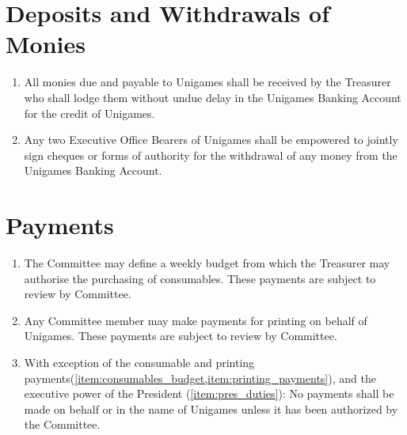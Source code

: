 \documentclass[a4paper]{article}
\begin{document}
\section{Deposits and Withdrawals of Monies} \label{sec:monies}
\begin{enumerate}
    \item All monies due and payable to Unigames shall be received by the Treasurer who shall lodge them without undue delay in the Unigames Banking Account for the credit of Unigames.
    \item Any two Executive Office Bearers of Unigames shall be empowered to jointly sign cheques or forms of authority for the withdrawal of any money from the Unigames Banking Account.
\end{enumerate}


\section{Payments} \label{sec:payments}
\begin{enumerate}
    \item \label{item:consumables_budget}The Committee may define a weekly budget from which the Treasurer may authorise the purchasing of consumables. These payments are subject to review by Committee.
    \item \label{item:printing_payments} Any Committee member may make payments for printing on behalf of Unigames. These payments are subject to review by Committee.
    \item With exception of the consumable and printing payments(\cref{item:consumables_budget,item:printing_payments}), and the executive power of the President (\cref{item:pres_duties}): No payments shall be made on behalf or in the name of Unigames unless it has been authorized by the Committee.
\end{enumerate}
\end{document}
